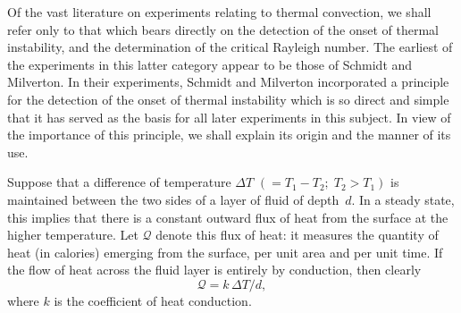 Of the vast literature on experiments relating to thermal convection,
we shall refer only to that which bears directly on the detection of the
onset of thermal instability, and the determination of the critical
Rayleigh number.  The earliest of the experiments in this latter category
appear to be those of Schmidt and Milverton.  In their experiments,
Schmidt and Milverton incorporated a principle for the detection of the
onset of thermal instability which is so direct and simple that it has
served as the basis for all later experiments in this subject.  In view of
the importance of this principle, we shall explain its origin and the
manner of its use.

Suppose that a difference of temperature $\Delta T$ $(= T_1 - T_2;\; T_2 > T_1)$
is maintained between the two sides of a layer of fluid of depth~$d$.  In a
steady state, this implies that there is a constant outward flux of heat
from the surface at the higher temperature.  Let $\mathscr{Q}$ denote this flux
of heat: it measures the quantity of heat (in calories) emerging from the
surface, per unit area and per unit time.  If the flow of heat across the
fluid layer is entirely by conduction, then clearly
\begin{equation}
\label{eq:2-323}
\mathscr{Q} = k\,\Delta T / d,
\end{equation}
where $k$ is the coefficient of heat conduction.
